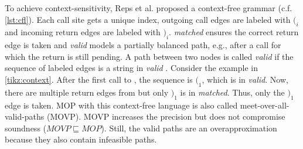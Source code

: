 \documentclass[../draft.tex]{subfiles}
\begin{document}
    To achieve context-sensitivity, Reps et al. proposed a context-free grammar (c.f. \autoref{lst:cfl}). 
    Each call site gets a unique index, outgoing call edges are labeled with $(_i$ and incoming return edges are labeled with $)_i$. 
    \textit{matched} ensures the correct return edge is taken and \textit{valid} models a partially balanced path, e.g., after a call for which the return is still pending.
    A path between two nodes is called \textit{valid} if the sequence of labeled edges is a string in \textit{valid} \cite{Reps1995}. 
    Consider the example in \autoref{tikz:context}. 
    After the first call to , the sequence is $(_1$, which is in \textit{valid}. 
    Now, there are multiple return edges from  but only $)_1$ is in \textit{matched}. 
    Thus, only the $)_1$ edge is taken. 
    MOP with this context-free language is also called meet-over-all-valid-paths (MOVP). MOVP increases the precision but does not compromise soundness ($\mathit{MOVP} \sqsubseteq \mathit{MOP}$). 
    Still, the valid paths are an overapproximation because they also contain infeasible paths.
\end{document}
